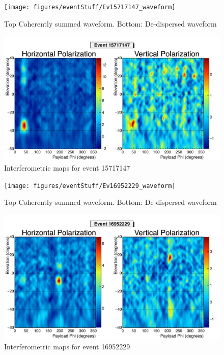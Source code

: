 		
		\begin{figure}
		\centering
			\texttt{[image: figures/eventStuff/Ev15717147\_waveform]}
			\caption{Top Coherently summed waveform.  Bottom: De-dispersed waveform} 
		\label{fig:Ev15717147_waveform}
		\end{figure}
		
		\begin{figure}
		\centering
			\includegraphics[width=\textwidth]{figures/intMap/intMap_ev15717147}
			\caption{Interferometric maps for event 15717147} 
		\label{fig:Ev15717147_map}
		\end{figure}			
	
		\begin{figure}
		\centering
			\texttt{[image: figures/eventStuff/Ev16952229\_waveform]}
			\caption{Top Coherently summed waveform.  Bottom: De-dispersed waveform} 
		\label{fig:Ev16952229_waveform}
		\end{figure}
		
		\begin{figure}
		\centering
			\includegraphics[width=\textwidth]{figures/intMap/intMap_ev16952229}
			\caption{Interferometric maps for event 16952229} 
		\label{fig:Ev16952229_map}
		\end{figure}			
	

